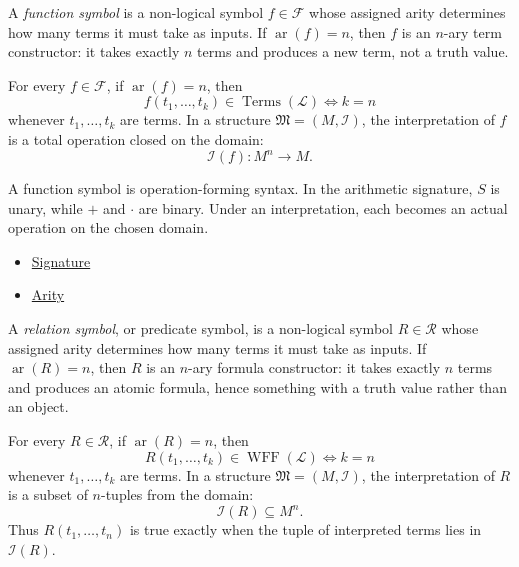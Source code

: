 \begin{definition}
\label{def:signature-function-symbol}
A \emph{function symbol} is a non-logical symbol $f\in\mathcal{F}$ whose
assigned arity determines how many terms it must take as inputs. If
$\operatorname{ar}(f)=n$, then $f$ is an $n$-ary term constructor: it takes
exactly $n$ terms and produces a new term, not a truth value.
\end{definition}

\begin{remark*}
For every $f\in\mathcal{F}$, if $\operatorname{ar}(f)=n$, then
\[
  f(t_1,\ldots,t_k)\in\operatorname{Terms}(\mathcal{L})
  \iff k=n
\]
whenever $t_1,\ldots,t_k$ are terms. In a structure
$\mathfrak{M}=(M,\mathcal{I})$, the interpretation of $f$ is a total operation
closed on the domain:
\[
  \mathcal{I}(f):M^n\to M.
\]
\end{remark*}

\begin{remark*}[Interpretation]
A function symbol is operation-forming syntax. In the arithmetic signature,
$S$ is unary, while $+$ and $\cdot$ are binary. Under an interpretation, each
becomes an actual operation on the chosen domain.
\end{remark*}

\begin{dependencies}
\begin{itemize}
  \item \hyperref[def:signature]{Signature}
  \item \hyperref[def:arity]{Arity}
\end{itemize}
\end{dependencies}

\begin{definition}
\label{def:relation-symbol}
A \emph{relation symbol}, or predicate symbol, is a non-logical symbol
$R\in\mathcal{R}$ whose assigned arity determines how many terms it must take
as inputs. If $\operatorname{ar}(R)=n$, then $R$ is an $n$-ary formula
constructor: it takes exactly $n$ terms and produces an atomic formula, hence
something with a truth value rather than an object.
\end{definition}

\begin{remark*}
For every $R\in\mathcal{R}$, if $\operatorname{ar}(R)=n$, then
\[
  R(t_1,\ldots,t_k)\in\operatorname{WFF}(\mathcal{L})
  \iff k=n
\]
whenever $t_1,\ldots,t_k$ are terms. In a structure
$\mathfrak{M}=(M,\mathcal{I})$, the interpretation of $R$ is a subset of
$n$-tuples from the domain:
\[
  \mathcal{I}(R)\subseteq M^n.
\]
Thus $R(t_1,\ldots,t_n)$ is true exactly when the tuple of interpreted terms
lies in $\mathcal{I}(R)$.
\end{remark*}

